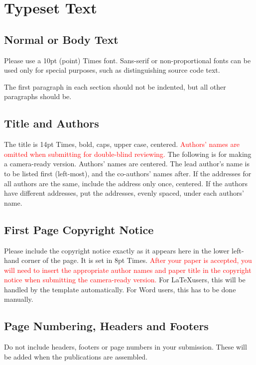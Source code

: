 \documentclass{article}
\begin{document}
\section{Typeset Text}\label{sec:typeset_text}

\subsection{Normal or Body Text}\label{subsec:body}

Please use a 10pt (point) Times font. Sans-serif or non-proportional fonts
can be used only for special purposes, such as distinguishing source code text.

The first paragraph in each section should not be indented, but all other paragraphs should be.

\subsection{Title and Authors}

The title is 14pt Times, bold, caps, upper case, centered.
\textcolor{red}{Authors' names are omitted when submitting for double-blind reviewing.}
The following is for making a camera-ready version.
Authors' names are centered.
The lead author's name is to be listed first (left-most), and the co-authors' names after.
If the addresses for all authors are the same, include the address only once, centered.
If the authors have different addresses, put the addresses, evenly spaced, under each authors' name.

\subsection{First Page Copyright Notice}

Please include the copyright notice exactly as it appears here in the lower left-hand corner of the page.
It is set in 8pt Times. \textcolor{red}{After your paper is accepted, you will need to insert the appropriate author names and paper title in the copyright notice when submitting the camera-ready version.} For \LaTeX users, this will be handled by the template automatically. For Word users, this has to be done manually.


\subsection{Page Numbering, Headers and Footers}

Do not include headers, footers or page numbers in your submission.
These will be added when the publications are assembled.
\end{document}
